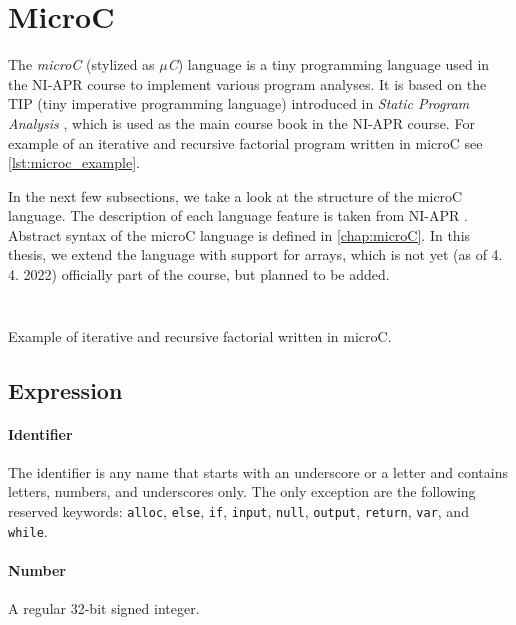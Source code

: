 \documentclass[thesis=M,english]{FITthesis}[2019/12/23]
\begin{document}
\section{MicroC}
The \emph{microC} (stylized as \emph{$\mu$C}) language is a tiny programming language used in the NI-APR course to implement various program analyses. It is based on the TIP (tiny imperative programming language) introduced in \emph{Static Program Analysis} \cite{spa}, which is used as the main course book in the NI-APR course. For example of an iterative and recursive factorial program written in microC see \autoref{lst:microc_example}.

In the next few subsections, we take a look at the structure of the microC language. The description of each language feature is taken from NI-APR \cite{microc}. Abstract syntax of the microC language is defined in \autoref{chap:microC}. In this thesis, we extend the language with support for arrays, which is not yet (as of 4. 4. 2022) officially part of the course, but planned to be added.

\begin{listing}
\centering
\begin{minipage}{.4\linewidth}
	\inputminted[tabsize=2,breaklines,bgcolor=codebg,escapeinside=||]{python}{snippets/microc_fac_iter.m}
\end{minipage}%
\hskip0.2cm
\begin{minipage}{.5\linewidth}
	\inputminted[tabsize=2,breaklines,bgcolor=codebg,escapeinside=||]{python}{snippets/microc_fac_rec.m}
\end{minipage}%
	\caption{Example of iterative and recursive factorial written in microC.}
	\label{lst:microc_example}
\end{listing}

\subsection{Expression}
\paragraph*{Identifier}
The identifier is any name that starts with an underscore or a letter and contains letters, numbers, and underscores only. The only exception are the following reserved keywords: \texttt{alloc}, \texttt{else}, \texttt{if}, \texttt{input}, \texttt{null}, \texttt{output}, \texttt{return}, \texttt{var}, and \texttt{while}.

\paragraph*{Number} A regular 32-bit signed integer.
\end{document}
